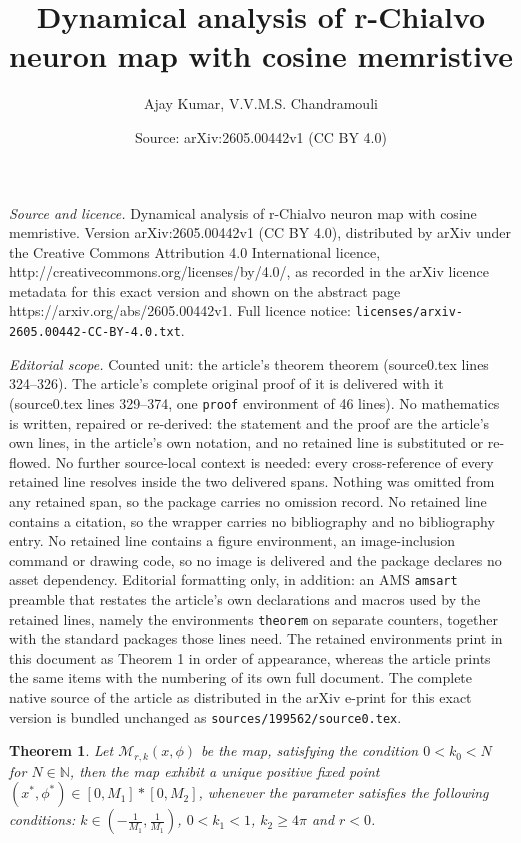 \documentclass[10pt,a4paper]{amsart}
\title{Dynamical analysis of r-Chialvo neuron map with cosine memristive}
\author{Ajay Kumar, V.V.M.S. Chandramouli}
\date{Source: arXiv:2605.00442v1 (CC BY 4.0)}
\newtheorem{theorem}{Theorem}
\begin{document}
\maketitle

\noindent\emph{Source and licence.} Dynamical analysis of r-Chialvo neuron map with cosine memristive. Version arXiv:2605.00442v1 (CC BY 4.0), distributed by arXiv under the Creative Commons Attribution 4.0 International licence, http://creativecommons.org/licenses/by/4.0/, as recorded in the arXiv licence metadata for this exact version and shown on the abstract page https://arxiv.org/abs/2605.00442v1. Full licence notice: \texttt{licenses/arxiv-2605.00442-CC-BY-4.0.txt}.\par\smallskip

\noindent\textit{Editorial scope.} Counted unit: the article's theorem theorem (source0.tex lines 324--326). The article's complete original proof of it is delivered with it (source0.tex lines 329--374, one \texttt{proof} environment of 46 lines). No mathematics is written, repaired or re-derived: the statement and the proof are the article's own lines, in the article's own notation, and no retained line is substituted or re-flowed.  No further source-local context is needed: every cross-reference of every retained line resolves inside the two delivered spans.  Nothing was omitted from any retained span, so the package carries no omission record.  No retained line contains a citation, so the wrapper carries no bibliography and no bibliography entry.  No retained line contains a figure environment, an image-inclusion command or drawing code, so no image is delivered and the package declares no asset dependency.  Editorial formatting only, in addition: an AMS \texttt{amsart} preamble that restates the article's own declarations and macros used by the retained lines, namely the environments \texttt{theorem} on separate counters, together with the standard packages those lines need.  The retained environments print in this document as Theorem 1 in order of appearance, whereas the article prints the same items with the numbering of its own full document.  The complete native source of the article as distributed in the arXiv e-print for this exact version is bundled unchanged as \texttt{sources/199562/source0.tex}.
\begin{theorem}
Let $\mathcal{M}_{r,k}(x,\phi)$ be the map, satisfying the condition $0<k_0<N$ for $N\in \mathbb{N}$, then the map exhibit a unique positive fixed point $(x^*,\phi^*)\in [0,M_1]*[0,M_2]$, whenever the parameter satisfies the following conditions: $k\in (-\frac{1}{M_1},\frac{1}{M_1})$, $0<k_1<1$, $k_2\geq4\pi$ and $r<0$.
\end{theorem}
\end{document}
